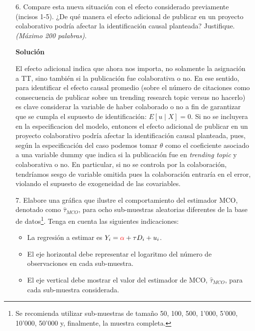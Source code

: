 \documentclass[a4paper, answers, addpoints, 11pt]{exam}
\newenvironment{solucion}{%
  \begin{mdframed}[
    backgroundcolor=blue!5,    %
    linecolor=blue!50,          %
    linewidth=2pt,              %
    leftmargin=10pt,            %
    rightmargin=8pt,           %
    topline=true,              %
    bottomline=true,            %
    roundcorner=10pt,           %
    innerleftmargin=10pt,       %
    innerrightmargin=10pt,      %
    innerbottommargin=10pt,     %
    innertopmargin=10pt         %
  ]%
  \begin{tcolorbox}[colframe=blue!50!black, colback=blue!50, coltitle=white, sharp corners=all, boxrule=1mm, width=\textwidth, halign=left, valign=center, top=0mm, bottom=0mm, left=0mm, right=0mm] \textbf{Solución} \end{tcolorbox} }{\end{mdframed}}
\begin{document}
\begin{itemize}
    \item[6.] Compare esta nueva situación con el efecto considerado previamente (incisos 1-5). ¿De qué manera el efecto adicional de publicar en un proyecto colaborativo podría afectar la identificación causal planteada? Justifique. \textit{(Máximo 200 palabras)}.
    \begin{solucion}
        El efecto adicional indica que ahora nos importa, no solamente la asignación a TT, sino también si la publicación fue colaborativa o no. En ese sentido, para identificar el efecto causal promedio (sobre el número de citaciones como consecuencia de publicar sobre un trending research topic versus no hacerlo) es clave considerar la variable de haber colaborado o no a fin de garantizar que se cumpla el supuesto de identificación: $E[u \mid X]=0$. Si no se incluyera en la especificacion del modelo, entonces el efecto adicional de publicar en un proyecto colaborativo podría afectar la identificación causal planteada, pues, según la especificación del caso podemos tomar $\theta$ como el coeficiente asociado a una variable dummy que indica si la publicación fue en \textit{trending topic} y colaborativa o no. En particular, si no se controla por la colaboración, tendríamos sesgo de variable omitida pues la colaboración entraría en el error, violando el supuesto de exogeneidad de las covariables.
    \end{solucion}

    \item[7.] Elabore una gráfica que ilustre el comportamiento del estimador MCO, denotado como $\hat{\tau}_{MCO}$, para ocho sub-muestras aleatorias diferentes de la base de datos\footnote{Se recomienda utilizar sub-muestras de tamaño 50, 100, 500, 1'000, 5'000, 10'000, 50'000 y, finalmente, la muestra completa.}. Tenga en cuenta las siguientes indicaciones:  

    \begin{itemize}
        \item La regresión a estimar es $Y_i = \textcolor{red}{\alpha}+\tau D_i + u_i$.
    
        \item El eje horizontal debe representar el logaritmo del número de observaciones en cada sub-muestra.  

        \item El eje vertical debe mostrar el valor del estimador de MCO, $\hat{\tau}_{MCO}$, para cada sub-muestra considerada.  


\end{itemize}
\end{itemize}
\end{document}
